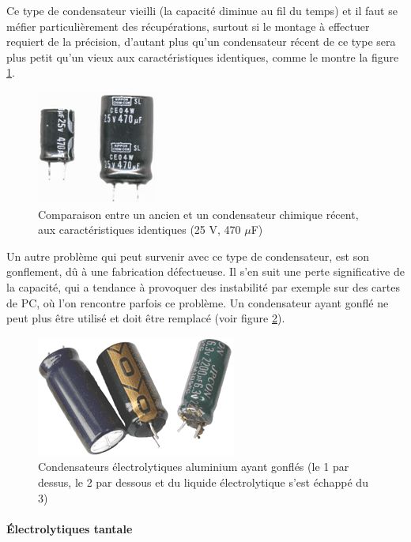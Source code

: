 \documentclass[a4paper]{article}
\begin{document}
Ce type de condensateur vieilli (la capacité diminue au fil du temps) et il faut se méfier particulièrement des récupérations, surtout si le montage à effectuer requiert de la précision, d'autant plus qu'un condensateur récent de ce type sera plus petit qu'un vieux aux caractéristiques identiques, comme le montre la figure \ref{Condensateur_chimique_age}.

\begin{figure}[H]
	\centering
	\includegraphics[scale=0.75]{Images/Condensateur_chimique_age.png}
	\caption{Comparaison entre un ancien et un condensateur chimique récent, aux caractéristiques identiques (25 V, 470 $\mu$F)
		\label{Condensateur_chimique_age}}
\end{figure}

Un autre problème qui peut survenir avec ce type de condensateur, est son gonflement, dû à une fabrication défectueuse. Il s'en suit une perte significative de la capacité, qui a tendance à provoquer des instabilité par exemple sur des cartes de PC, où l'on rencontre parfois ce problème. Un condensateur ayant \og{}gonflé\fg{} ne peut plus être utilisé et doit être remplacé (voir figure \ref{Condensateurs_gonfles}).

\begin{figure}[H]
	\centering
	\includegraphics[scale=0.75]{Images/Condensateurs_gonfles.png}
	\caption{Condensateurs électrolytiques aluminium ayant gonflés (le 1\ier{} par dessus, le 2\ieme{} par dessous et du liquide électrolytique s'est échappé du 3\ieme{})
		\label{Condensateurs_gonfles}}
\end{figure}

\paragraph{Électrolytiques tantale}
\end{document}
